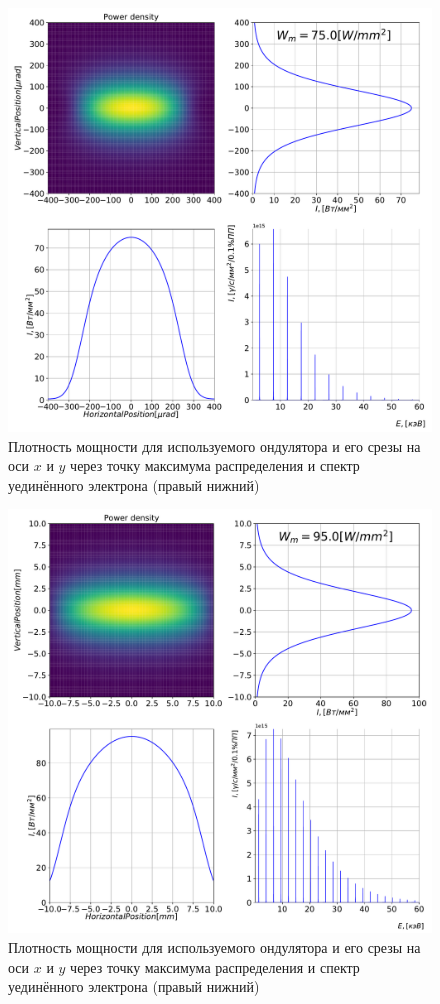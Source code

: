\begin{figure}[h!]
	\centering  
	\includegraphics[width=\textwidth]{pic/power_dens_1-2.pdf}
	\caption{Плотность мощности для используемого ондулятора и его срезы на оси $x$ и $y$ через точку максимума распределения и спектр уединённого электрона (правый нижний)}
	\label{fig:power_dens_1-2}   
\end{figure}
\begin{figure}[h!]
	\centering  
	\includegraphics[width=\textwidth]{pic/power_dens_1-4.pdf}
	\caption{Плотность мощности для используемого ондулятора и его срезы на оси $x$ и $y$ через точку максимума распределения и спектр уединённого электрона (правый нижний)}
	\label{fig:power_dens_1-4}   
\end{figure}

